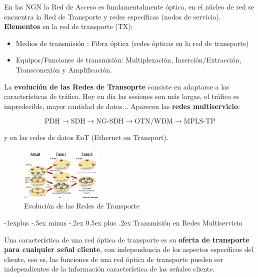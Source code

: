 \documentclass[10pt,portrait, twocolumn]{article}
\makeatletter
\renewcommand{\subsection}{\@startsection{subsection}{2}{0mm}%
                                {-1explus -.5ex minus -.2ex}%
                                {0.5ex plus .2ex}%
                                {\normalfont\normalsize\bfseries}}
\makeatother
\begin{document}
En las NGN la Red de Acceso es fundamentalmente óptica, en el núcleo de red se encuentra la Red de Transporte y redes específicas (nodos de servicio).\\

\textbf{Elementos} en la red de transporte (TX):

	\begin{itemize}
	\item Medios de transmisión : Fibra óptica (redes ópticas en la red de transporte)
	\item Equipos/Funciones de transmisión: Multiplexación, Inserción/Extracción, Transconexión y Amplificación.
	\end{itemize}
	
La \textbf{evolución de las Redes de Transoprte} consiste en adaptarse a las características de tráfico. Hoy en día las sesiones son más largas, el tráfico es impredecible, mayor cantidad de datos... Aparecen las \textbf{redes multiservicio}:

	\begin{equation*}
	\text{PDH} \rightarrow \text{SDH} \rightarrow \text{NG-SDH} \rightarrow \text{OTN/WDM} \rightarrow \text{MPLS-TP}
	\end{equation*}
	
y en las redes de datos EoT (Ethernet on Transport).

\begin{figure}[h]
	\centering
     \includegraphics[width=0.35\textwidth]{EvolucionRdT}
      \caption{Evolución de las Redes de Transporte}
      \label{fig:Regiones de frecuencias}
  \end{figure}

\subsection{Transmisión en Redes Multiservicio}

Una característica de una red óptica de transporte es su \textbf{oferta de transporte para cualquier señal cliente}, con independencia de los aspectos específicos del cliente, eso es, las funciones de una red óptica de transporte pueden ser independientes de la información característica de las señales cliente.
\end{document}
